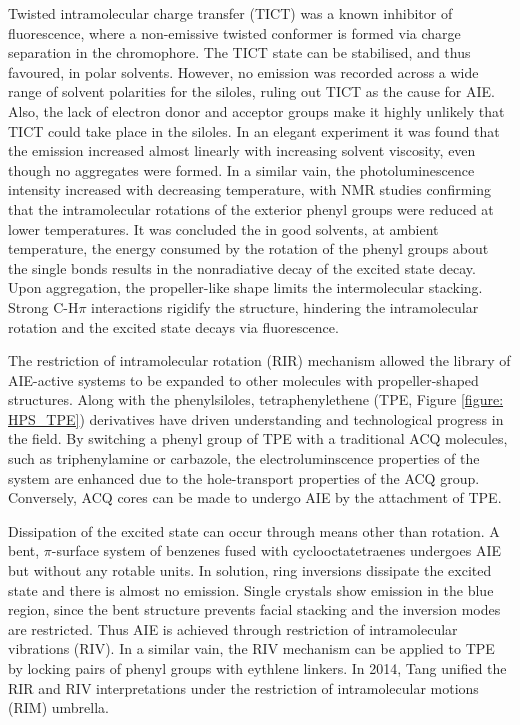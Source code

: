 Twisted intramolecular charge transfer (TICT) was a known inhibitor of fluorescence, where a non-emissive twisted conformer is formed via charge separation in the chromophore. The TICT state can be stabilised, and thus favoured, in polar solvents. However, no emission was recorded across a wide range of solvent polarities for the siloles, ruling out TICT as the cause for AIE. Also, the lack of electron donor and acceptor groups make it highly unlikely that TICT could take place in the siloles. In an elegant experiment it was found that the emission increased almost linearly with increasing solvent viscosity, even though no aggregates were formed. In a similar vain, the photoluminescence intensity increased with decreasing temperature, with NMR studies confirming that the intramolecular rotations of the exterior phenyl groups were reduced at lower temperatures. It was concluded the in good solvents, at ambient temperature, the energy consumed by the rotation of the phenyl groups about the single bonds results in the nonradiative decay of the excited state decay. Upon aggregation, the propeller-like shape limits the intermolecular stacking. Strong C-H\textperiodcentered\textperiodcentered\textperiodcentered$\pi$ interactions rigidify the structure, hindering the intramolecular rotation and the excited state decays via fluorescence.\cite{Chen2003}

The restriction of intramolecular rotation (RIR) mechanism allowed the library of AIE-active systems to be expanded to other molecules with propeller-shaped structures. Along with the phenylsiloles, tetraphenylethene (TPE, Figure \ref{figure: HPS_TPE})  derivatives have driven understanding and technological progress in the field.\cite{Hong2009,Wang2010a,Hong2011,Mei2014,Hu2014,Mei2015} By switching a phenyl group of TPE with a traditional ACQ molecules, such as triphenylamine or carbazole, the electroluminscence properties of the system are enhanced due to the hole-transport properties of the ACQ group.\cite{Chan2014} Conversely, ACQ cores can be made to undergo AIE by the attachment of TPE.\cite{Yuan2010a}

Dissipation of the excited state can occur through means other than rotation. A bent, $\pi$-surface system of benzenes fused with cyclooctatetraenes undergoes AIE but without any rotable units.\cite{Nishiuchi2013} In solution, ring inversions dissipate the excited state and there is almost no emission. Single crystals show emission in the blue region, since the bent structure prevents facial stacking and the inversion modes are restricted. Thus AIE is achieved through restriction of intramolecular vibrations (RIV). In a similar vain, the RIV mechanism can be applied to TPE by locking pairs of phenyl groups with eythlene linkers. In 2014, Tang unified the RIR and RIV interpretations under the restriction of intramolecular motions (RIM) umbrella.\cite{Leung2014}

